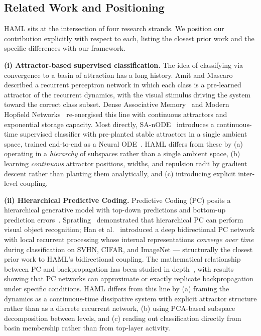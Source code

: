 \documentclass[11pt,a4paper]{article}
\begin{document}
\subsection{Related Work and Positioning}
\label{sec:related}

HAML sits at the intersection of four research strands. We position our contribution
explicitly with respect to each, listing the closest prior work and the specific
differences with our framework.

\textbf{(i) Attractor-based supervised classification.} The idea of classifying via
convergence to a basin of attraction has a long history. Amit and
Mascaro~\cite{amit2001attractor} described a recurrent perceptron network in which each
class is a pre-learned attractor of the recurrent dynamics, with the visual stimulus
driving the system toward the correct class subset. Dense Associative
Memory~\cite{krotov2016dense} and Modern Hopfield
Networks~\cite{ramsauer2021hopfield} re-energised this line with continuous attractors and
exponential storage capacity. Most directly,
SA-nODE~\cite{marino2024} introduces a continuous-time supervised classifier with
pre-planted stable attractors in a single ambient space, trained end-to-end as a Neural
ODE~\cite{chen2018neural}. HAML differs from these by (a) operating in a
\emph{hierarchy} of subspaces rather than a single ambient space, (b) learning
\emph{continuous} attractor positions, widths, and repulsion radii by gradient descent
rather than planting them analytically, and (c) introducing explicit inter-level
coupling.

\textbf{(ii) Hierarchical Predictive Coding.} Predictive Coding (PC) posits a
hierarchical generative model with top-down predictions and bottom-up prediction
errors~\cite{rao1999predictive,friston2005theory}.
Spratling~\cite{spratling2017hierarchical} demonstrated that hierarchical PC can perform
visual object recognition; Han et al.~\cite{han2018deep} introduced a deep bidirectional
PC network with local recurrent processing whose internal representations \emph{converge
over time} during classification on SVHN, CIFAR, and ImageNet --- structurally the
closest prior work to HAML's bidirectional coupling. The mathematical relationship
between PC and backpropagation has been studied in
depth~\cite{whittington2017approximation,song2020can,salvatori2021exactbp}, with
results showing that PC networks can approximate or exactly replicate backpropagation
under specific conditions. HAML differs from this line by (a) framing the dynamics as a
continuous-time dissipative system with explicit attractor structure rather than as a
discrete recurrent network, (b) using PCA-based subspace decomposition between levels,
and (c) reading out classification directly from basin membership rather than from
top-layer activity.
\end{document}
